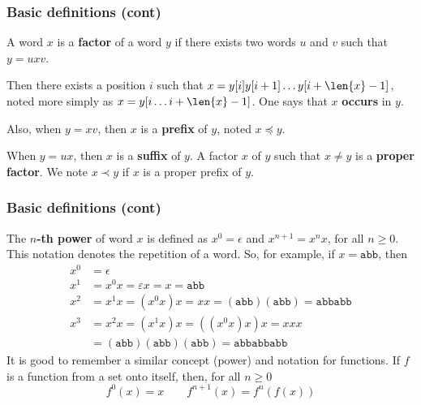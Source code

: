 %
\begin{frame}
\frametitle{Basic definitions (cont)}

A word \(x\) is a \textbf{factor} of a word \(y\) if there exists two
words \(u\) and \(v\) such that \(y = uxv\). 

\bigskip

Then there exists a position \(i\) such that \(x = y[i] y[i+1] \dots
y[i + \len{x} - 1]\), noted more simply as \(x = y[i \dots i + \len{x}
  - 1]\). One says that \(x\) \textbf{occurs} in \(y\).

\bigskip

Also, when \(y = xv\), then \(x\) is a \textbf{prefix} of \(y\), noted
\(x \preccurlyeq y\). 

\bigskip

When \(y = ux\), then \(x\) is a \textbf{suffix} of \(y\). A factor
\(x\) of \(y\) such that \(x \neq y\) is a \textbf{proper factor}. We
note \(x \prec y\) if \(x\) is a proper prefix of \(y\).

\end{frame}

%
\begin{frame}
\frametitle{Basic definitions (cont)}

The \textbf{\(n\)-th power} of word \(x\) is defined as \(x^0 =
\epsilon\) and \(x^{n+1} = x^{n} x\), for all \(n \geqslant 0\). This
notation denotes the repetition of a word. So, for example, if \(x =
\texttt{abb}\), then
\begin{align*}
x^0 &= \epsilon\\
x^1 &= x^0 x = \varepsilon x = x = \texttt{abb}\\
x^2 &= x^1 x = (x^0 x) x = xx = (\texttt{abb})(\texttt{abb}) =
\texttt{abbabb}\\
x^3 &= x^2 x = (x^1 x) x = ((x^0 x) x) x = xxx\\
    &= (\texttt{abb})(\texttt{abb})(\texttt{abb}) = \texttt{abbabbabb}
\end{align*}
It is good to remember a similar concept (power) and notation for
functions. If \(f\) is a function from a set onto itself, then, for
all \(n \geqslant 0\)
\[
f^0(x) = x \qquad f^{n+1}(x) = f^{n}(f(x))
\]

\end{frame}

